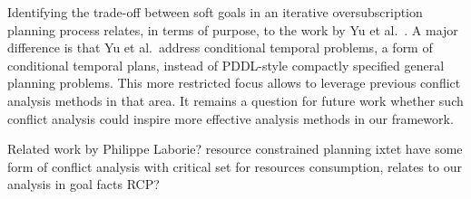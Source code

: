%
Identifying the trade-off between soft goals in an iterative
oversubscription planning process relates, in terms of purpose, to the
work by Yu et al.\ \cite{yu:etal:jair-17}. A major difference is that
Yu et al.\ address conditional temporal problems, a form of
conditional temporal plans, instead of PDDL-style compactly specified
general planning problems. This more restricted focus allows to
leverage previous conflict analysis methods in that area. It remains a
question for future work whether such conflict analysis could inspire
more effective analysis methods in our framework.


Related work by Philippe Laborie? resource constrained planning ixtet
have some form of conflict analysis with critical set for resources
consumption, relates to our analysis in goal facts RCP?
